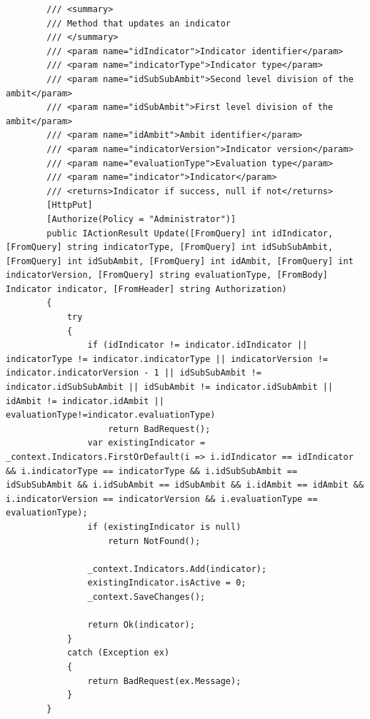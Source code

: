 \begin{itemize}
\begin{itemize}
\begin{lstlisting}
        /// <summary>
        /// Method that updates an indicator
        /// </summary>
        /// <param name="idIndicator">Indicator identifier</param>
        /// <param name="indicatorType">Indicator type</param>
        /// <param name="idSubSubAmbit">Second level division of the ambit</param>
        /// <param name="idSubAmbit">First level division of the ambit</param>
        /// <param name="idAmbit">Ambit identifier</param>
        /// <param name="indicatorVersion">Indicator version</param>
        /// <param name="evaluationType">Evaluation type</param>
        /// <param name="indicator">Indicator</param>
        /// <returns>Indicator if success, null if not</returns>
        [HttpPut]
        [Authorize(Policy = "Administrator")]
        public IActionResult Update([FromQuery] int idIndicator, [FromQuery] string indicatorType, [FromQuery] int idSubSubAmbit, [FromQuery] int idSubAmbit, [FromQuery] int idAmbit, [FromQuery] int indicatorVersion, [FromQuery] string evaluationType, [FromBody] Indicator indicator, [FromHeader] string Authorization)
        {
            try
            {
                if (idIndicator != indicator.idIndicator || indicatorType != indicator.indicatorType || indicatorVersion != indicator.indicatorVersion - 1 || idSubSubAmbit != indicator.idSubSubAmbit || idSubAmbit != indicator.idSubAmbit || idAmbit != indicator.idAmbit || evaluationType!=indicator.evaluationType)
                    return BadRequest();
                var existingIndicator = _context.Indicators.FirstOrDefault(i => i.idIndicator == idIndicator && i.indicatorType == indicatorType && i.idSubSubAmbit == idSubSubAmbit && i.idSubAmbit == idSubAmbit && i.idAmbit == idAmbit && i.indicatorVersion == indicatorVersion && i.evaluationType == evaluationType);
                if (existingIndicator is null)
                    return NotFound();

                _context.Indicators.Add(indicator);
                existingIndicator.isActive = 0;
                _context.SaveChanges();

                return Ok(indicator);
            }
            catch (Exception ex)
            {
                return BadRequest(ex.Message);
            }
        }


\end{lstlisting}
\end{itemize}
\end{itemize}
